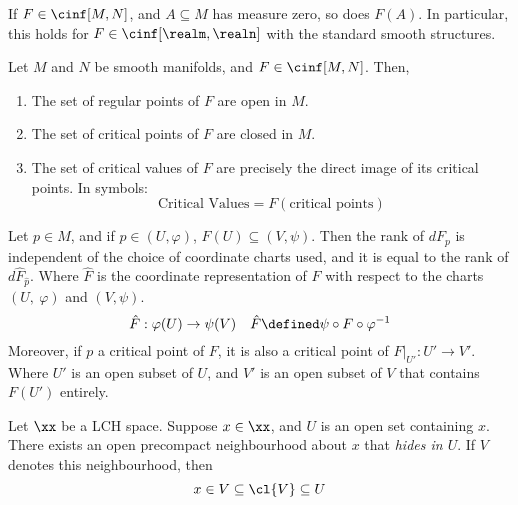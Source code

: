 \documentclass[../main-v2-manifolds.tex]{subfiles}
\begin{document}
\begin{wts}\label{lee-theorem6.9}
    If $F\in\cinf[M,N]$, and $A\subseteq M$ has measure zero, so does $F(A)$. In particular, this holds for $F\in\cinf[\realm,\realn]$ with the standard smooth structures.
\end{wts}


\begin{lemma}\label{lee-regular-critical-points}
    Let $M$ and $N$ be smooth manifolds, and $F\in\cinf[M,N]$. Then,
    \begin{enumerate}
        \item The set of regular points of $F$ are open in $M$.
        \item The set of critical points of $F$ are closed in $M$.
        \item The set of critical values of $F$ are precisely the direct image of its critical points. In symbols:
        \begin{equation}\label{lee-critical-values-image-of-critia-points}
            \text{Critical Values} = F(\text{critical points})
        \end{equation}
    \end{enumerate}
\end{lemma}
\begin{lemma}\label{lee-critical-points-local}
    Let $p\in M$, and if $p\in (U,\varphi)$, $F(U)\subseteq(V,\psi)$. Then the rank of $dF_p$ is independent of the choice of coordinate charts used, and it is equal to the rank of $d\hat{F}_{\hat{p}}$. Where $\hat{F}$ is the coordinate representation of $F$ with respect to the charts $(U,\: \varphi)$ and $(V,\psi)$.
        \[
            \hat{F}:\varphi(U)\to\psi(V)\quad \hat{F}\defined \psi\circ F\circ \varphi^{-1}
        \]
    Moreover, if $p$ a critical point of $F$, it is also a critical point of $F|_{U'}:U'\to V'$. Where $U'$ is an open subset of $U$, and $V'$ is an open subset of $V$ that contains $F(U')$ entirely.
\end{lemma}
\begin{lemma}\label{lee-sards-LCH}
    Let $\xx$ be a LCH space. Suppose $x\in \xx$, and $U$ is an open set containing $x$. There exists an open precompact neighbourhood about $x$ that \emph{hides in $U$}. If $V$ denotes this neighbourhood, then
    \[
        x\in V\subseteq\cl{V}\subseteq U
    \]
\end{lemma}
\end{document}
